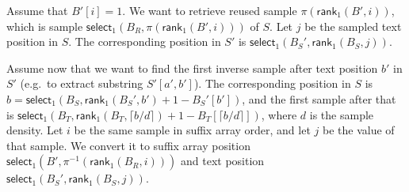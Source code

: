 \documentclass[11pt,a4paper]{article}
\newcommand{\mrank}{\ensuremath{\mathsf{rank}}}
\newcommand{\mselect}{\ensuremath{\mathsf{select}}}
\begin{document}
Assume that $B'[i] = 1$. We want to retrieve reused sample $\pi(\mrank_{1}(B', i))$, which is sample $\mselect_{1}(B_{R}, \pi(\mrank_{1}(B', i)))$ of $S$. Let $j$ be the sampled text position in $S$. The corresponding position in $S'$ is $\mselect_{1}(B_{S}', \mrank_{1}(B_{S}, j))$.

Assume now that we want to find the first inverse sample after text position $b'$ in $S'$ (e.g.~to extract substring $S'[a',b']$). The corresponding position in $S$ is $b = \mselect_{1}(B_{S}, \mrank_{1}(B_{S}', b') + 1 - B_{S}'[b'])$, and the first sample after that is $\mselect_{1}(B_{T}, \mrank_{1}(B_{T}, \lceil b/d \rceil) + 1 - B_{T}[\lceil b/d \rceil])$, where $d$ is the sample density. Let $i$ be the same sample in suffix array order, and let $j$ be the value of that sample. We convert it to suffix array position $\mselect_{1}(B', \pi^{-1}(\mrank_{1}(B_{R}, i)))$ and text position $\mselect_{1}(B_{S}', \mrank_{1}(B_{S}, j))$.
\end{document}
